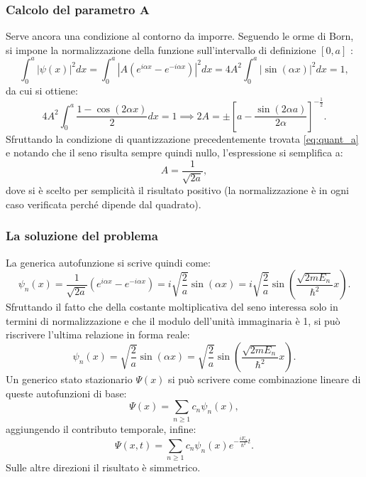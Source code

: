 \documentclass[a4paper,11pt]{report}
\begin{document}
\subsubsection{Calcolo del parametro $\bm{A}$}
Serve ancora una condizione al contorno da imporre. Seguendo le orme di Born, si impone la normalizzazione della funzione sull'intervallo di definizione $[0,a]$ :
\begin{equation}
\int_0^a |\psi(x)|^2 dx = \int_0^a |A(e^{i\alpha x} - e^{-i\alpha x})|^2 dx = 4A^2\int_0^a |\sin(\alpha x)|^2 dx = 1,
\end{equation}
da cui si ottiene:
\begin{equation}
4A^2\int_0^a \frac{1-\cos(2\alpha x)}{2} dx = 1 \implies 2A = \pm \left[ a-\frac{\sin(2\alpha a)}{2\alpha}\right]^{-\frac{1}{2}}.
\end{equation}
Sfruttando la condizione di quantizzazione precedentemente trovata \eqref{eq:quant_a} e notando che il seno risulta sempre quindi nullo, l'espressione si semplifica a:
\begin{equation}
 A = \frac{1}{\sqrt{2a}},
\end{equation}
dove si è scelto per semplicità il risultato positivo (la normalizzazione è in ogni caso verificata perché dipende dal quadrato). 

\subsubsection{La soluzione del problema}
La generica autofunzione si scrive quindi come:
\begin{equation}
 \psi_n(x) = \frac{1}{\sqrt{2a}}(e^{i\alpha x} - e^{-i\alpha x}) = i\sqrt{\frac{2}{{a}}} \sin(\alpha x) = i\sqrt{\frac{2}{{a}}} \sin\left(\frac{\sqrt{2mE_n}}{\hbar^2}x \right).
\end{equation}
Sfruttando il fatto che della costante moltiplicativa del seno interessa solo in termini di normalizzazione e che il modulo dell'unità immaginaria è 1, si può riscrivere l'ultima relazione in forma reale:
\begin{equation}
 \psi_n(x) = \sqrt{\frac{2}{{a}}} \sin(\alpha x) = \sqrt{\frac{2}{{a}}} \sin\left(\frac{\sqrt{2mE_n}}{\hbar^2}x \right).
\end{equation}
Un generico stato stazionario $\Psi(x)$ si può scrivere come combinazione lineare di queste autofunzioni di base:
\begin{equation}
 \Psi(x) = \sum_{n \geq 1} c_n\psi_n(x),
\end{equation}
aggiungendo il contributo temporale, infine:
\begin{equation}
 \Psi(x,t) = \sum_{n \geq 1} c_n\psi_n(x)e^{-\frac{iE_n}{\hbar^2}t}.
\end{equation}
Sulle altre direzioni il risultato è simmetrico.
\end{document}
